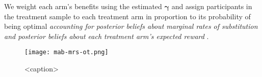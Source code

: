 \documentclass{article}
\begin{document}
We weight each arm's benefits using the estimated $\bm{\gamma}$ and 
assign participants in the treatment sample to each treatment arm in proportion to its probability of being optimal \textit{
    accounting for posterior beliefs about marginal rates of substitution and 
    posterior beliefs about each treatment arm's expected reward
}.

\begin{figure}[htbp]
    \centering
    \texttt{[image: mab-mrs-ot.png]} 
    \caption{<caption>}
    \label{<label>}
\end{figure}
\end{document}
